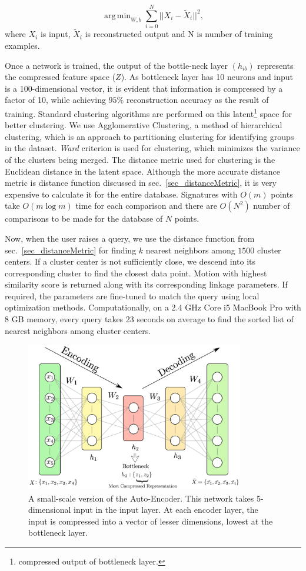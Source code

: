 \documentclass[twocolumn,10pt]{asme2ej}
\DeclareMathOperator*{\argminA}{arg\,min}
\begin{document}
\begin{equation}\label{nnloss}
  \argminA_{W, b} \sum_{i=0}^{N} || X_i - \tilde{X}_i ||^2,
\end{equation}
where $X_i$ is input, $\tilde{X}_i$ is reconstructed output and N is number of training examples.


Once a network is trained, the output of the bottle-neck layer $(h_{ib})$ represents the compressed feature space ($Z$).
As bottleneck layer has 10 neurons and input is a 100-dimensional vector, it is evident that information is compressed by a factor of 10, while achieving $95\%$ reconstruction accuracy as the result of training.
Standard clustering algorithms are performed on this latent\footnote{compressed output of bottleneck layer.} space for better clustering\cite{song2013}.
We use Agglomerative Clustering, a method of hierarchical clustering, which is an approach to partitioning clustering for identifying groups in the dataset.
\emph{Ward}\cite{ward1963} criterion is used for clustering, which minimizes the variance of the clusters being merged.
The distance metric used for clustering is the Euclidean distance in the latent space.
Although the more accurate distance metric is distance function discussed in sec.~\ref{sec_distanceMetric}, it is very expensive to calculate it for the entire database.
Signatures with ${O}(m)$ points take ${O}(m\log{}m)$ time for each comparison and there are ${O}(N^2)$ number of comparisons to be made for the database of $N$ points.

Now, when the user raises a query, we use the distance function from sec.~\ref{sec_distanceMetric} for finding $k$ nearest neighbors among $1500$ cluster centers.
If a cluster center is not sufficiently close, we descend into its corresponding cluster to find the closest data point.
Motion with highest similarity score is returned along with its corresponding linkage parameters.
If required, the parameters are fine-tuned to match the query using local optimization methods.
Computationally, on a 2.4 GHz Core i5 MacBook Pro with 8 GB memory, every query takes 23 seconds on average to find the sorted list of nearest neighbors among cluster centers.

\begin{figure}
\centering
\includegraphics[width=270pt]{figure/fig_auto_encoder.eps}
  \caption{A small-scale version of the Auto-Encoder. This network takes 5-dimensional input in the input layer. At each encoder layer, the input is compressed into a vector of lesser dimensions, lowest at the bottleneck layer.}
\label{autoEncoder}
\end{figure}
\end{document}
